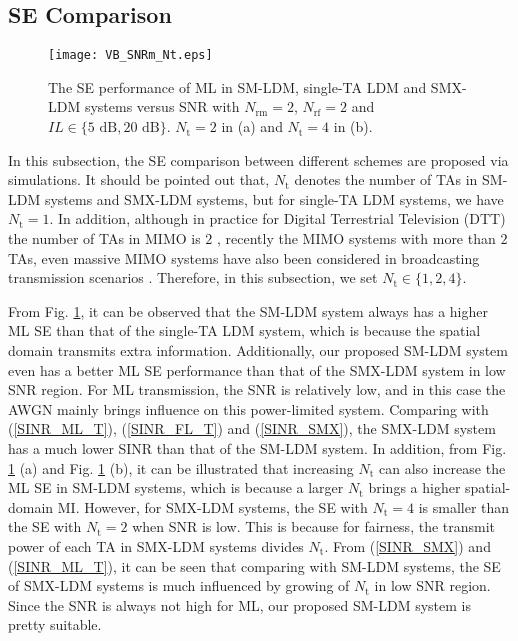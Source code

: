 \documentclass[journal]{IEEEtran}
\begin{document}
\subsection{SE Comparison}

\begin{figure}
  \centering
  \texttt{[image: VB\_SNRm\_Nt.eps]}
  \caption{The SE performance of ML in SM-LDM, single-TA LDM and SMX-LDM systems versus SNR with $N_\text{rm} = 2$, $N_\text{rf} = 2$ and $\textit{IL} \in \{5 \text{ dB}, 20 \text{ dB}\}$. $N_\text{t} = 2$ in (a) and $N_\text{t} = 4$ in (b).}\label{VB_SNRm_Nt}
\end{figure}

In this subsection, the SE comparison between different schemes are proposed via simulations. It should be pointed out that, $N_\text{t}$ denotes the number of TAs in SM-LDM systems and SMX-LDM systems, but for single-TA LDM systems, we have $N_\text{t} = 1$. In addition, although in practice for Digital Terrestrial Television (DTT) the number of TAs in MIMO is $2$ \cite{ATSC_MIMO}, recently the MIMO systems with more than $2$ TAs, even massive MIMO systems have also been considered in broadcasting transmission scenarios \cite{SM_TBC} \cite{SM_Jiao}. Therefore, in this subsection, we set $N_\text{t} \in \{1,2,4\}$.

From Fig. \ref{VB_SNRm_Nt}, it can be observed that the SM-LDM system always has a higher ML SE than that of the single-TA LDM system, which is because the spatial domain transmits extra information. Additionally, our proposed SM-LDM system even has a better ML SE performance than that of the SMX-LDM system in low SNR region. For ML transmission, the SNR is relatively low, and in this case the AWGN mainly brings influence on this power-limited system. Comparing with (\ref{SINR_ML_T}), (\ref{SINR_FL_T}) and (\ref{SINR_SMX}), the SMX-LDM system has a much lower SINR than that of the SM-LDM system. In addition, from Fig. \ref{VB_SNRm_Nt} (a) and Fig. \ref{VB_SNRm_Nt} (b), it can be illustrated that increasing $N_\text{t}$ can also increase the ML SE in SM-LDM systems, which is because a larger $N_\text{t}$ brings a higher spatial-domain MI. However, for SMX-LDM systems, the SE with $N_\text{t} = 4$ is smaller than the SE with $N_\text{t} = 2$ when SNR is low. This is because for fairness, the transmit power of each TA in SMX-LDM systems divides $N_\text{t}$. From (\ref{SINR_SMX}) and (\ref{SINR_ML_T}), it can be seen that comparing with SM-LDM systems, the SE of SMX-LDM systems is much influenced by growing of $N_\text{t}$ in low SNR region. Since the SNR is always not high for ML, our proposed SM-LDM system is pretty suitable.
\end{document}

